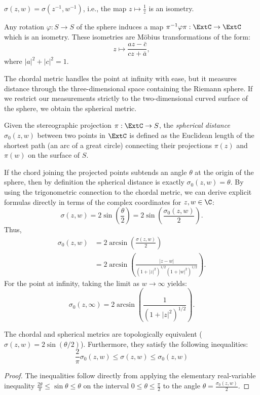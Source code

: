 \begin{remark}
    $\sigma(z,w) = \sigma(z^{-1}, w^{-1})$, i.e., the map $z \mapsto
    \frac{1}{z}$ is an isometry.
\end{remark}

\begin{remark}
    Any rotation $\varphi: S \rightarrow S$ of the sphere induces a map
    $\pi^{-1} \varphi \pi : \ExtC \rightarrow \ExtC$ which is an isometry. These
    isometries are Möbius transformations of the form:
    \[
        z \mapsto \frac{a z - \bar{c}}{c z + \bar{a}},
    \]
    where $|a|^2 + |c|^2 = 1$.
\end{remark}

The chordal metric handles the point at infinity with ease, but it measures
distance through the three-dimensional space containing the Riemann sphere. If
we restrict our measurements strictly to the two-dimensional curved surface of
the sphere, we obtain the spherical metric.

\begin{definition}
    Given the stereographic projection $\pi: \ExtC \to S$, the \emph{spherical
    distance} $\sigma_0(z,w)$ between two points in $\ExtC$ is defined as the
    Euclidean length of the shortest path (an arc of a great circle) connecting
    their projections $\pi(z)$ and $\pi(w)$ on the surface of $S$.
\end{definition}

If the chord joining the projected points subtends an angle $\theta$ at the
origin of the sphere, then by definition the spherical distance is exactly
$\sigma_0(z,w) = \theta$. By using the trigonometric connection to the chordal
metric, we can derive explicit formulas directly in terms of the complex
coordinates for $z, w \in \C$:
\[
    \sigma(z,w) = 2 \sin\left( \frac{\theta}{2} \right) = 2 \sin\left( \frac{\sigma_0(z,w)}{2} \right).
\]
Thus,
\begin{align*}
    \sigma_0(z,w) &= 2 \arcsin\left( \frac{\sigma(z,w)}{2} \right) \\
                  &= 2 \arcsin\left( \frac{|z-w|}{(1+|z|^2)^{1/2}(1+|w|^2)^{1/2}} \right).
\end{align*}
For the point at infinity, taking the limit as $w \to \infty$ yields:
\[
    \sigma_0(z,\infty) = 2 \arcsin\left( \frac{1}{(1+|z|^2)^{1/2}} \right).
\]

\begin{remark}
    The chordal and spherical metrics are topologically equivalent ($\sigma(z,w)
    = 2 \sin(\theta/2)$). Furthermore, they satisfy the following inequalities:
    \[
        \frac{2}{\pi} \sigma_0(z,w) \le \sigma(z,w) \le \sigma_0(z,w)
    \]
\end{remark}
\begin{proof}
    The inequalities follow directly from applying the elementary real-variable
    inequality $\frac{2\theta}{\pi} \le \sin\theta \le \theta$ on the interval
    $0 \le \theta \le \frac{\pi}{2}$ to the angle $\theta =
    \frac{\sigma_0(z,w)}{2}$.
\end{proof}


